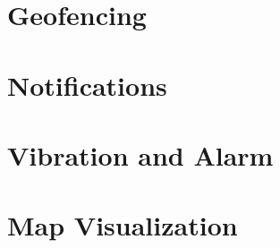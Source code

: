 




\section{Geofencing} %
\section{Notifications}
\section{Vibration and Alarm}
\section{Map Visualization}

